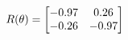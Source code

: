 \documentclass[preview]{standalone}
\begin{document}
\begin{align*}
\special{dvisvgm:raw <g id='unique000'>}R(\theta) = \begin{bmatrix}-0.97 & 0.26\\-0.26 & -0.97\end{bmatrix}\special{dvisvgm:raw </g>}
\end{align*}
\end{document}
